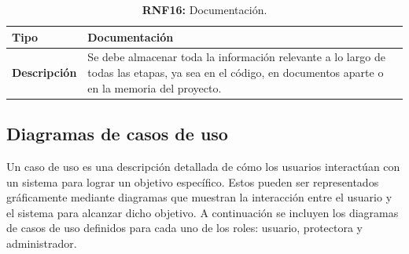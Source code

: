 \documentclass[a4paper, 12pt]{article}
\begin{document}
\begin{table}[H]
\captionsetup{list=no}%
\captionsetup{justification=raggedright,singlelinecheck=false}
\captionsetup{labelformat=empty}
\caption*{\textbf{RNF16:} Documentación.}
\label{tab:RNF16}
    \begin{tabular}{|m{5cm}|m{10cm}|}
	    \hline
	    \textbf{Tipo} & Documentación \\ 
	    \hline
	    \textbf{Descripción} & Se debe almacenar toda la información relevante a lo largo de todas las etapas, ya sea en el código, en documentos aparte o en la memoria del proyecto. \\ 
	    \hline
    \end{tabular}
\end{table}



\subsection{Diagramas de casos de uso}

Un caso de uso es una descripción detallada de cómo los usuarios interactúan con un sistema para lograr un objetivo específico. Estos pueden ser representados gráficamente mediante diagramas que muestran la interacción entre el usuario y el sistema para alcanzar dicho objetivo. A continuación se incluyen los diagramas de casos de uso definidos para cada uno de los roles: usuario, protectora y administrador.
\end{document}
